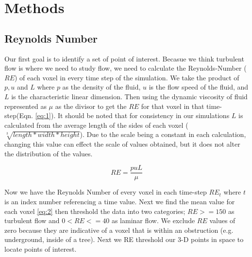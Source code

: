 
\chapter{Methods} %

\label{Chapter2} %


\section{Reynolds Number}

Our first goal is to identify a set of point of interest. Becasue we think turbulent flow is where we need to study flow, we need to calculate the Reynolds-Number (\ensuremath{RE}) of each voxel in every time step of the simulation. We take the product of \ensuremath{p,u} and \ensuremath{L} where \ensuremath{p} as the density of the fluid, \ensuremath{u} is the flow speed of the fluid, and \ensuremath{L} is the characteristic linear dimension. Then using the dynamic viscosity of fluid represented as $\mu$ as the divisor to get the \ensuremath{RE} for that voxel in that time-step(Eqn. \ref{eq:1}). It should be noted that for consistency in our simulations \ensuremath{L} is calculated from the average length of the sides of each voxel (\ensuremath{\sqrt[3]{length*width*height}}).  Due to the scale being a constant in each calculation, changing this value can effect the scale of values obtained, but it does not alter the distribution of the values. 

\begin{equation}\label{eq:1}
RE  = \frac{puL} {\mu} 
\end{equation}

Now we have the Reynolds Number of every voxel in each time-step \ensuremath{RE_t} where \ensuremath{t} is an index number referencing a time value. Next we find the mean value for each voxel \ref{eq:2} then threshold the data into two categories; \ensuremath{RE>=150} as turbulent flow and \ensuremath{0<RE<=40} as laminar flow. We exclude \ensuremath{RE} values of zero because they are indicative of a voxel that is within an obstruction (e.g. underground, inside of a tree). Next we RE threshold our 3-D points in space to locate points of interest.

